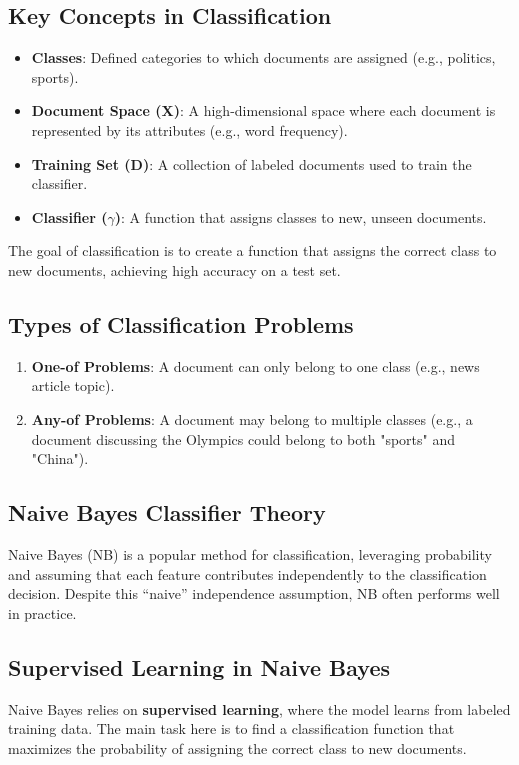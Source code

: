 \documentclass{article}
\begin{document}
\subsection*{Key Concepts in Classification}
\begin{itemize}
    \item \textbf{Classes}: Defined categories to which documents are assigned (e.g., politics, sports).
    \item \textbf{Document Space (X)}: A high-dimensional space where each document is represented by its attributes (e.g., word frequency).
    \item \textbf{Training Set (D)}: A collection of labeled documents used to train the classifier.
    \item \textbf{Classifier ($\gamma$)}: A function that assigns classes to new, unseen documents.
\end{itemize}

The goal of classification is to create a function that assigns the correct class to new documents, achieving high accuracy on a test set.

\subsection*{Types of Classification Problems}
\begin{enumerate}
    \item \textbf{One-of Problems}: A document can only belong to one class (e.g., news article topic).
    \item \textbf{Any-of Problems}: A document may belong to multiple classes (e.g., a document discussing the Olympics could belong to both "sports" and "China").
\end{enumerate}

\subsection*{Naive Bayes Classifier Theory}
Naive Bayes (NB) is a popular method for classification, leveraging probability and assuming that each feature contributes independently to the classification decision. Despite this “naive” independence assumption, NB often performs well in practice.

\subsection*{Supervised Learning in Naive Bayes}
Naive Bayes relies on \textbf{supervised learning}, where the model learns from labeled training data. The main task here is to find a classification function that maximizes the probability of assigning the correct class to new documents.
\end{document}
